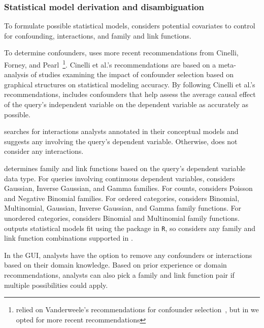 \subsubsection{Statistical model derivation and disambiguation}
\statisticalModelDisambiguation
To formulate possible statistical models, \rTisane considers potential
covariates to control for confounding, interactions, and family and link
functions.

To determine confounders, \rTisane uses more recent recommendations from
Cinelli, Forney, and Pearl~\cite{cinelli2020controls}\footnote{\tisane relied on
Vanderweele's recommendations for confounder
selection~\cite{vanderweele2019modifiedDisjunctiveCriterion}, but in \rTisane we
opted for more recent recommendations}. Cinelli et al.'s recommendations are
based on a meta-analysis of studies examining the impact of confounder selection
based on graphical structures on statistical modeling accuracy. By following
Cinelli et al.'s recommendations, \rTisane includes confounders that help assess
the average causal effect of the query's independent variable on the dependent
variable as accurately as possible. 

\rTisane searches for interactions analysts annotated in their conceptual models
and suggests any involving the query's dependent variable. Otherwise, \rTisane
does not consider any interactions. 

\rTisane determines family and link functions based on the query's dependent
variable data type. For queries involving continuous dependent variables,
\rTisane considers Gaussian, Inverse Gaussian, and Gamma families. For counts,
\rTisane considers Poisson and Negative Binomial families. For ordered
categories, \rTisane considers Binomial, Multinomial, Gaussian, Inverse
Gaussian, and Gamma family functions. For unordered categories, \rTisane
considers Binomial and Multinomial family functions. \rTisane outputs
statistical models fit using the \lme package in \texttt{R}, so \rTisane
considers any family and link function combinations supported in \lme.

In the GUI, analysts have the option to remove any confounders or interactions
based on their domain knowledge. Based on prior experience or domain
recommendations, analysts can also pick a family and link function pair if
multiple possibilities could apply. 